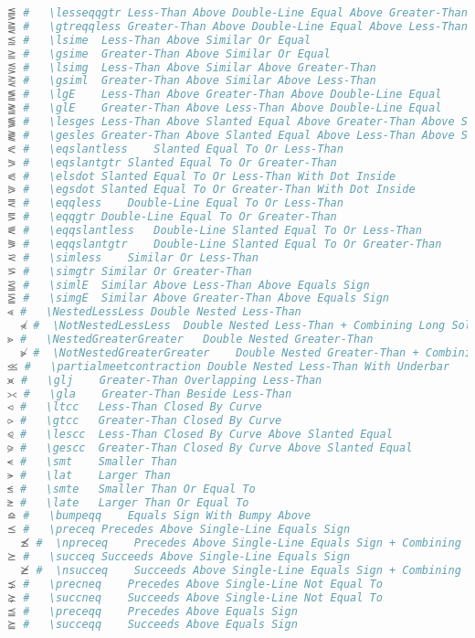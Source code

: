 \begin{lstlisting}[language=Julia, style=julia, linewidth=\textwidth]
⪋ #   \lesseqqgtr Less-Than Above Double-Line Equal Above Greater-Than
⪌ #   \gtreqqless Greater-Than Above Double-Line Equal Above Less-Than
⪍ #   \lsime  Less-Than Above Similar Or Equal
⪎ #   \gsime  Greater-Than Above Similar Or Equal
⪏ #   \lsimg  Less-Than Above Similar Above Greater-Than
⪐ #   \gsiml  Greater-Than Above Similar Above Less-Than
⪑ #   \lgE    Less-Than Above Greater-Than Above Double-Line Equal
⪒ #   \glE    Greater-Than Above Less-Than Above Double-Line Equal
⪓ #   \lesges Less-Than Above Slanted Equal Above Greater-Than Above Slanted Equal
⪔ #   \gesles Greater-Than Above Slanted Equal Above Less-Than Above Slanted Equal
⪕ #   \eqslantless    Slanted Equal To Or Less-Than
⪖ #   \eqslantgtr Slanted Equal To Or Greater-Than
⪗ #   \elsdot Slanted Equal To Or Less-Than With Dot Inside
⪘ #   \egsdot Slanted Equal To Or Greater-Than With Dot Inside
⪙ #   \eqqless    Double-Line Equal To Or Less-Than
⪚ #   \eqqgtr Double-Line Equal To Or Greater-Than
⪛ #   \eqqslantless   Double-Line Slanted Equal To Or Less-Than
⪜ #   \eqqslantgtr    Double-Line Slanted Equal To Or Greater-Than
⪝ #   \simless    Similar Or Less-Than
⪞ #   \simgtr Similar Or Greater-Than
⪟ #   \simlE  Similar Above Less-Than Above Equals Sign
⪠ #   \simgE  Similar Above Greater-Than Above Equals Sign
⪡ #   \NestedLessLess Double Nested Less-Than
  ⪡̸ #  \NotNestedLessLess  Double Nested Less-Than + Combining Long Solidus Overlay
⪢ #   \NestedGreaterGreater   Double Nested Greater-Than
  ⪢̸ #  \NotNestedGreaterGreater    Double Nested Greater-Than + Combining Long Solidus
⪣ #   \partialmeetcontraction Double Nested Less-Than With Underbar
⪤ #   \glj    Greater-Than Overlapping Less-Than
⪥ #   \gla    Greater-Than Beside Less-Than
⪦ #   \ltcc   Less-Than Closed By Curve
⪧ #   \gtcc   Greater-Than Closed By Curve
⪨ #   \lescc  Less-Than Closed By Curve Above Slanted Equal
⪩ #   \gescc  Greater-Than Closed By Curve Above Slanted Equal
⪪ #   \smt    Smaller Than
⪫ #   \lat    Larger Than
⪬ #   \smte   Smaller Than Or Equal To
⪭ #   \late   Larger Than Or Equal To
⪮ #   \bumpeqq    Equals Sign With Bumpy Above
⪯ #   \preceq Precedes Above Single-Line Equals Sign
  ⪯̸ #  \npreceq    Precedes Above Single-Line Equals Sign + Combining Long Solidus Overlay
⪰ #   \succeq Succeeds Above Single-Line Equals Sign
  ⪰̸ #  \nsucceq    Succeeds Above Single-Line Equals Sign + Combining Long Solidus Overlay
⪱ #   \precneq    Precedes Above Single-Line Not Equal To
⪲ #   \succneq    Succeeds Above Single-Line Not Equal To
⪳ #   \preceqq    Precedes Above Equals Sign
⪴ #   \succeqq    Succeeds Above Equals Sign

\end{lstlisting}
